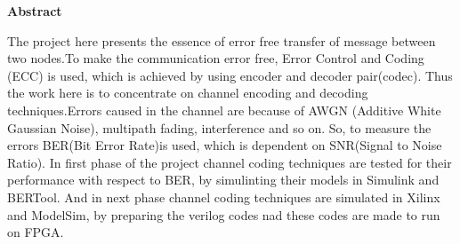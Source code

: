 \documentclass{beamer}
\date{}
\begin{document}
%	
%		




\begin{frame}{\scriptsize \LARGE \centering \textbf{Abstract}}
	\begin{block}{}
	\begin{center}
		 \justify The project here presents the essence of error free transfer of message between two nodes.To make the communication error free, Error Control and Coding (ECC) is used, which is achieved by using encoder and decoder pair(codec). Thus the work here is to concentrate on channel encoding and decoding techniques.Errors caused in the channel are because of  AWGN (Additive White Gaussian Noise), multipath fading, interference and so on. So, to measure the errors BER(Bit Error Rate)is used, which is dependent on SNR(Signal to Noise Ratio). In first phase of the project channel coding techniques are tested for their performance with respect to BER, by simulinting their models in Simulink and BERTool. And in next phase channel coding techniques are simulated in Xilinx and ModelSim, by preparing the verilog codes nad these codes are made to run on FPGA.
	\end{center}
	\end{block}
\end{frame}
\end{document}
